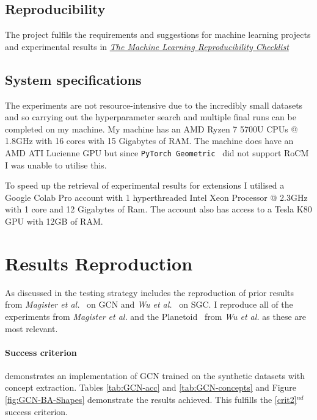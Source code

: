 \subsection{Reproducibility}
The project fulfils the requirements and suggestions for machine learning projects and experimental results in \href{https://www.cs.mcgill.ca/~jpineau/ReproducibilityChecklist-v2.0.pdf}{\textit{The Machine Learning Reproducibility Checklist}}~\cite{pineau2021improving} 

\subsection{System specifications}
The experiments are not resource-intensive due to the incredibly small datasets and so carrying out the hyperparameter search and multiple final runs can be completed on my machine.
My machine has an AMD Ryzen 7 5700U CPUs @ 1.8GHz with 16 cores with 15 Gigabytes of RAM.
The machine does have an AMD ATI Lucienne GPU but since \texttt{PyTorch Geometric}~\cite{paszke2019pytorch} did not support RoCM I was unable to utilise this.

To speed up the retrieval of experimental results for extensions I utilised a Google Colab Pro account with 1 hyperthreaded Intel Xeon Processor @ 2.3GHz with 1 core and 12 Gigabytes of Ram.
The account also has access to a Tesla K80 GPU with 12GB of RAM.

\section{Results Reproduction}
\label{sec:reproduction}

As discussed in  the testing strategy includes the reproduction of prior results from \textit{Magister et al.}~\cite{magister2021gcexplainer} on GCN and \textit{Wu et al.}~\cite{wu2019simplifying} on SGC.
I reproduce all of the experiments from \textit{Magister et al.} and the Planetoid~\cite{kipf2016semi} from \textit{Wu et al.} as these are most relevant.

\paragraph{Success criterion}
 demonstrates an implementation of GCN trained on the synthetic datasets with concept extraction.
Tables \ref{tab:GCN-acc} and \ref{tab:GCN-concepts} and Figure \ref{fig:GCN-BA-Shapes} demonstrate the results achieved.
This fulfills the \ref{crit2}$^{nd}$ success criterion.

